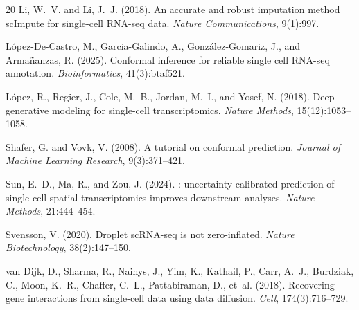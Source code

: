 \documentclass{article}
\begin{document}
\begin{thebibliography}{20}
Li, W.~V. and Li, J.~J. (2018).
\newblock An accurate and robust imputation method scImpute for single-cell {RNA-seq} data.
\newblock \emph{Nature Communications}, 9(1):997.

L{\'o}pez-De-Castro, M., Garcia-Galindo, A., Gonz{\'a}lez-Gomariz, J., and Arma{\~n}anzas, R. (2025).
\newblock Conformal inference for reliable single cell {RNA-seq} annotation.
\newblock \emph{Bioinformatics}, 41(3):btaf521.

L{\'o}pez, R., Regier, J., Cole, M.~B., Jordan, M.~I., and Yosef, N. (2018).
\newblock Deep generative modeling for single-cell transcriptomics.
\newblock \emph{Nature Methods}, 15(12):1053--1058.

Shafer, G. and Vovk, V. (2008).
\newblock A tutorial on conformal prediction.
\newblock \emph{Journal of Machine Learning Research}, 9(3):371--421.

Sun, E.~D., Ma, R., and Zou, J. (2024).
: uncertainty-calibrated prediction of single-cell spatial transcriptomics improves downstream analyses.
\newblock \emph{Nature Methods}, 21:444--454.

Svensson, V. (2020).
\newblock Droplet scRNA-seq is not zero-inflated.
\newblock \emph{Nature Biotechnology}, 38(2):147--150.

van Dijk, D., Sharma, R., Nainys, J., Yim, K., Kathail, P., Carr, A.~J., Burdziak, C., Moon, K.~R., Chaffer, C.~L., Pattabiraman, D., et~al. (2018).
\newblock Recovering gene interactions from single-cell data using data diffusion.
\newblock \emph{Cell}, 174(3):716--729.

\end{thebibliography}
\end{document}
